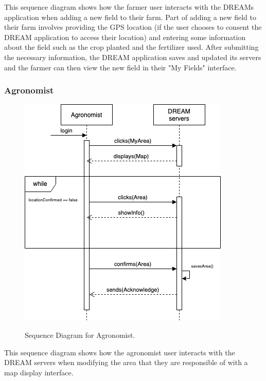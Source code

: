 \begin{flushleft}
This sequence diagram shows how the farmer user interacts with the DREAMs application when adding a new field to their farm. Part of adding a new field to their farm involves providing the GPS location (if the user chooses to consent the DREAM application to access their location) and entering some information about the field such as the crop planted and the fertilizer used. After submitting the necessary information, the DREAM application saves and updated its servers and the farmer can then view the new field in their "My Fields" interface. 
\end{flushleft}



\subsubsection{Agronomist}

\begin{figure}[hbt!]
\centering
\includegraphics[scale=0.6]{Files/sequence_disgrams/thePNGs/agronomist_choosingLocation.png}\\
\caption{\label{fig:agrSeqArea}Sequence Diagram for Agronomist.}
\end{figure}

\begin{flushleft}
This sequence diagram shows how the agronomist user interacts with the DREAM servers when modifying the area that they are responsible of with a map display interface. 
\end{flushleft}


